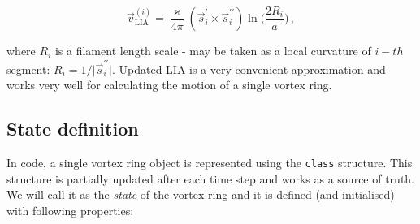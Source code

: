 \begin{equation}
\vec{v}_{\text{LIA}}^{(i)} =
\frac{\varkappa}{4\pi} (\vec{s}^{\prime}_i \times \vec{s}^{\prime \prime}_i)
\ln{\Bigg(\frac{2 R_i}{a}\Bigg)}\,,
\end{equation}

where $R_i$ is a filament length scale - may be taken as a local curvature of $i-th$ segment: $R_i = 1 / \vert \vec{s}^{\prime \prime}_i \vert$. Updated LIA is a very convenient approximation and works very well for calculating the motion of a single vortex ring.

\subsection*{State definition}

In code, a single vortex ring object is represented using the \texttt{class} structure. This structure is partially updated after each time step and works as a source of truth. We will call it as the \textit{state} of the vortex ring and it is defined (and initialised) with following properties:

